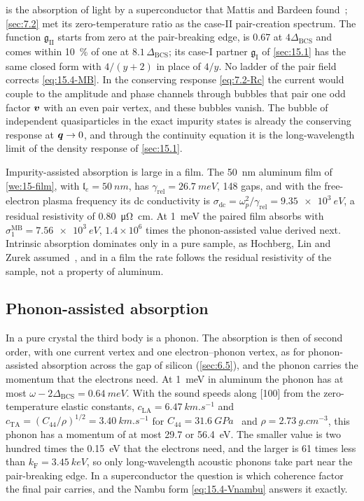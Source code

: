 \noindent {} is the absorption of light by a superconductor that Mattis and Bardeen found~\cite{mattis1958theory}; \cref{sec:7.2} met its zero-temperature ratio as the case-II pair-creation spectrum. The function $\mathfrak{g}_{\mathrm{II}}$ starts from zero at the pair-breaking edge, is 0.67 at $4\Delta_{\mathrm{BCS}}$ and comes within \SI{10}{\percent} of one at $8.1\,\Delta_{\mathrm{BCS}}$; its case-I partner $\mathfrak{g}_{\mathrm{I}}$ of \cref{sec:15.1} has the same closed form with $4/(y + 2)$ in place of $4/y$. No ladder of the pair field corrects \cref{eq:15.4-MB}. In the conserving response \cref{eq:7.2-Rc} the current would couple to the amplitude and phase channels through bubbles that pair one odd factor $\bm{v}$ with an even pair vertex, and these bubbles vanish. The bubble of independent quasiparticles in the exact impurity states is already the conserving response at $\bm{q} \to 0$, and through the continuity equation it is the long-wavelength limit of the density response of \cref{sec:15.1}.

Impurity-assisted absorption is large in a film. The \SI{50}{nm} aluminum film of \cref{we:15-film}, with $\mathfrak{l}_e = \SI{50}{nm}$, has $\gamma_{\mathrm{rel}} = \SI{26.7}{meV}$, 148 gaps, and with the free-electron plasma frequency its dc conductivity is $\sigma_{\mathrm{dc}} = \omega_p^2/\gamma_{\mathrm{rel}} = \SI{9.35e3}{eV}$, a residual resistivity of \SI{0.80}{\micro\ohm.cm}. At \SI{1}{meV} the paired film absorbs with $\sigma_1^{\mathrm{MB}} = \SI{7.56e3}{eV}$, $1.4\times10^6$ times the phonon-assisted value derived next. Intrinsic absorption dominates only in a pure sample, as Hochberg, Lin and Zurek assumed~\cite{hochberg2016absorption}, and in a film the rate follows the residual resistivity of the sample, not a property of aluminum.

\subsection{Phonon-assisted absorption}\label{sec:15.4-holstein}

In a pure crystal the third body is a phonon. The absorption is then of second order, with one current vertex and one electron--phonon vertex, as for phonon-assisted absorption across the gap of silicon (\cref{sec:6.5}), and the phonon carries the momentum that the electrons need. At \SI{1}{meV} in aluminum the phonon has at most $\omega - 2\Delta_{\mathrm{BCS}} = \SI{0.64}{meV}$. With the sound speeds along [100] from the zero-temperature elastic constants, $c_{\mathrm{LA}} = \SI{6.47}{km.s^{-1}}$ and $c_{\mathrm{TA}} = (C_{44}/\rho)^{1/2} = \SI{3.40}{km.s^{-1}}$ for $C_{44} = \SI{31.6}{GPa}$~\cite[Table~2]{malica2020quasi} and $\rho = \SI{2.73}{g.cm^{-3}}$, this phonon has a momentum of at most 29.7 or \SI{56.4}{eV}. The smaller value is two hundred times the \SI{0.15}{eV} that the electrons need, and the larger is 61 times less than $k_{\mathrm{F}} = \SI{3.45}{keV}$, so only long-wavelength acoustic phonons take part near the pair-breaking edge. In a superconductor the question is which coherence factor the final pair carries, and the Nambu form \cref{eq:15.4-Vnambu} answers it exactly.

